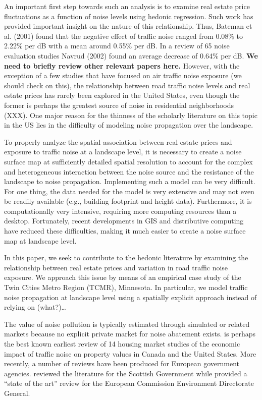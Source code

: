 \documentclass{article}\usepackage{graphicx, color}
\begin{document}
An important first step towards such an analysis is to examine real estate price fluctuations as a function of noise levels using hedonic regression.  Such work has provided important insight on the nature of this relationship.  Thus, Bateman et al. (2001) found that the negative eﬀect of traﬃc noise ranged from 0.08\% to 2.22\% per dB with a mean around 0.55\% per dB. In a review of 65 noise evaluation studies Navrud (2002) found an average decrease of 0.64\% per dB. \textbf{We need to briefly review other relevant papers here.}  However, with the exception of a few studies that have focused on air traffic noise exposure (we should check on this), the relationship between road traffic noise levels and real estate prices has rarely been explored in the United States, even though the former is perhaps the greatest source of noise in residential neighborhoods (XXX).  One major reason for the thinness of the scholarly literature on this topic in the US lies in the difficulty of modeling noise propagation over the landscape.  

To properly analyze the spatial association between real estate prices and exposure to traffic noise at a landscape level, it is necessary to create a noise surface map at sufficiently detailed spatial resolution to account for the complex and heterogeneous interaction between the noise source and the resistance of the landscape to noise propagation.  Implementing such a model can be very difficult.  For one thing, the data needed for the model is very extensive and may not even be readily available (e.g., building footprint and height data).  Furthermore, it is computationally very intensive, requiring more computing resources than a desktop. Fortunately, recent developments in GIS and distributive computing have reduced these difficulties, making it much easier to create a noise surface map at landscape level.  

In this paper, we seek to contribute to the hedonic literature by examining the relationship between real estate prices and variation in road traffic noise exposure.  We approach this issue by means of an empirical case study of the Twin Cities Metro Region (TCMR), Minnesota.  In particular, we model traffic noise propagation at landscape level using a spatially explicit approach instead of relying on (what?)…




The value of noise pollution is typically estimated through simulated or related markets because no explicit private market for noise abatement exists. \citet{Nelson1982} is perhaps the best known earliest review of 14 housing market studies of the economic impact of traffic noise on property values in Canada and the United States. More recently, a number of reviews have been produced for European government agencies. \citet{Bateman2001} reviewed the literature for the Scottish Government while \citet{Navrud2002} provided a ``state of the art'' review for the European Commission Environment Directorate General.
\end{document}
